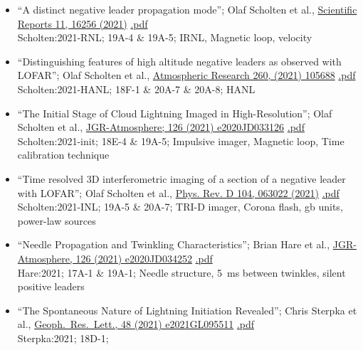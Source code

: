 \documentclass[fleqn,11pt]{article}
\begin{document}
\begin{itemize}
\begin{itemize}
\item ``A distinct negative leader propagation mode''; Olaf Scholten et al., \href{https://doi.org/10.1038/s41598-021-95433-5}{Scientific Reports 11, 16256 (2021)}
    \href{https://drive.google.com/file/d/1XpypnKAxR3FyLykyRzWAoUxFvL28hARR/view?usp=sharing}{.pdf}
    \\Scholten:2021-RNL; 19A-4 \& 19A-5; IRNL, Magnetic loop, velocity

\item ``Distinguishing features of high altitude negative leaders as observed with LOFAR''; Olaf Scholten et al.,  \href{https://doi.org/10.1016/j.atmosres.2021.105688}{Atmospheric Research 260, (2021) 105688}
    \href{https://drive.google.com/file/d/1wLVDcRHtn4y6_8YOZpkGAwZBdRTyYyJX/view?usp=sharing}{.pdf}
    \\{Scholten:2021-HANL}; 18F-1 \& 20A-7 \& 20A-8; HANL

\item ``The Initial Stage of Cloud Lightning Imaged in High-Resolution''; Olaf Scholten et al.,  \href{https://doi.org/10.1029/2020JD033126}{JGR-Atmosphere; 126 (2021) e2020JD033126}
    \href{https://drive.google.com/file/d/19PRFiMgDP3LL4h6mxRXacars_YDTt-cD/view?usp=sharing}{.pdf}
    \\Scholten:2021-init; 18E-4 \& 19A-5; Impulsive imager, Magnetic loop, Time calibration technique

\item ``Time resolved 3D interferometric imaging of a section of a negative leader with LOFAR''; Olaf Scholten et al.,
 \href{https://doi.org/10.1103/PhysRevD.104.063022}{Phys. Rev. D 104, 063022 (2021)}
\href{https://drive.google.com/file/d/1fJiIpzpxXCTO_vaRikzjwZ3oY4CreHMQ/view?usp=sharing}{.pdf}
\\{Scholten:2021-INL}; 19A-5 \& 20A-7; TRI-D imager, Corona flash, gb units, power-law sources

\item ``Needle Propagation and Twinkling Characteristics''; Brian Hare et al.,
 \href{https://doi.org/10.1029/2020JD034252}{JGR-Atmosphere, 126 (2021) e2020JD034252}
\href{https://drive.google.com/file/d/1GsGVVHsCDQ-RGP35GaYPmzNjQ4CtE_mj/view?usp=sharing}{.pdf}
\\Hare:2021; 17A-1 \& 19A-1; Needle structure, 5~ms between twinkles, silent positive leaders

\item ``The Spontaneous Nature of Lightning Initiation Revealed''; Chris Sterpka et al.,
 \href{https://doi.org/10.1029/2021GL095511}{Geoph.\ Res.\ Lett., 48 (2021) e2021GL095511}
\href{https://drive.google.com/file/d/1hHcdxKmEkFMTBIkShz1a8mte5alPVjZc/view?usp=sharing}{.pdf}
\\Sterpka:2021; 18D-1;


\end{itemize}
\end{itemize}
\end{document}
